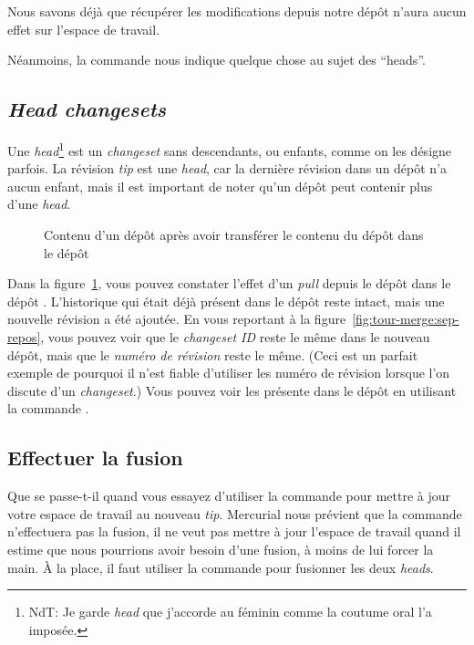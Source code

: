 Nous savons déjà que récupérer les modifications depuis notre dépôt 
 n'aura aucun effet sur l'espace de travail.


Néanmoins, la commande  nous indique quelque chose au 
sujet des ``heads''.

\subsection{\textit{Head changesets}} %

Une \textit{head}\footnote{NdT: Je garde \textit{head} que j'accorde 
au féminin comme la coutume oral l'a imposée.} est un \textit{changeset} 
sans descendants, ou enfants, comme on les désigne parfois. La révision 
\textit{tip} est une \textit{head}, car la dernière révision dans un dépôt 
n'a aucun enfant, mais il est important de noter qu'un dépôt peut contenir 
plus d'une \textit{head}.

\begin{figure}[ht]
  \centering
  \caption{Contenu d'un dépôt après avoir transférer le contenu du dépôt 
     dans le dépôt }
  \label{fig:tour-merge:pull}
\end{figure}

Dans la figure~\ref{fig:tour-merge:pull}, vous pouvez constater l'effet
d'un \textit{pull} depuis le dépôt  dans le dépôt 
. L'historique qui était déjà présent dans le dépôt
 reste intact, mais une nouvelle révision a été 
ajoutée. En vous reportant à la figure~\ref{fig:tour-merge:sep-repos},
vous pouvez voir que le \textit{\emph{changeset ID}} reste le même dans
le nouveau dépôt, mais que le \emph{numéro de révision} reste le même.
(Ceci est un parfait exemple de pourquoi il n'est fiable d'utiliser les
numéro de révision lorsque l'on discute d'un \textit{changeset}.) Vous
pouvez voir les  présente dans le dépôt en utilisant la 
commande .

\subsection{Effectuer la fusion}

Que se passe-t-il quand vous essayez d'utiliser la commande  
pour mettre à jour votre espace de travail au nouveau \textit{tip}.
Mercurial nous prévient que la commande  n'effectuera pas
la fusion, il ne veut pas mettre à jour l'espace de travail quand il 
estime que nous pourrions avoir besoin d'une fusion, à moins de lui
forcer la main. À la place, il faut utiliser la commande 
pour fusionner les deux \textit{heads}.

